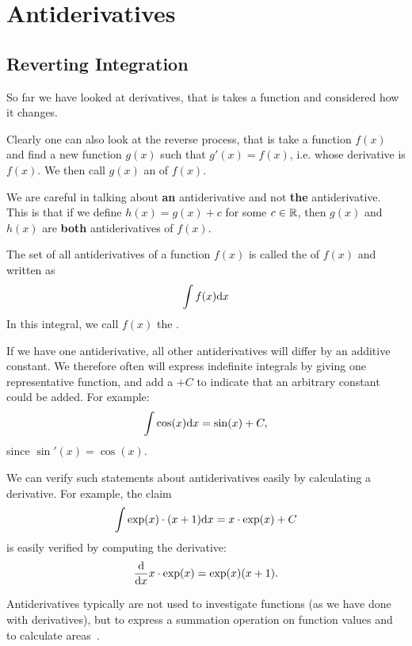 \chapter{Antiderivatives}
\label{chanti}
\section{Reverting Integration}

So far we have looked at derivatives, that is takes a function and
considered how it changes.

Clearly one can also look at the reverse process, that is take a function
$f(x)$ and find a new function $g(x)$ such that $g'(x)=f(x)$, i.e. whose
derivative is $f(x)$. We then call $g(x)$ an  of
$f(x)$.

\begin{note}
We are careful in talking about \textbf{an} antiderivative and not
\textbf{the} antiderivative. This is that if we define $h(x)=g(x)+c$ for
some $c\in{\mathbb R}$, then $g(x)$ and $h(x)$ are \textbf{both} antiderivatives of
$f(x)$.
\end{note}

\begin{defn}
The set of all antiderivatives of a function $f(x)$ is called the
 of $f(x)$ and written as
\[
\int f(x){\mbox{d}}x
\]
In this integral, we call $f(x)$ the .
\end{defn}

If we have one antiderivative, all other antiderivatives will differ by an
additive constant. We therefore often will express indefinite
integrals by giving one representative function, and add a $+C$ to indicate
that an arbitrary constant could be added. For example:
\[
\int \cos(x){\mbox{d}}x=\sin(x)+C,
\]
since $\sin'(x)=\cos(x)$.
\smallskip

We can verify such statements about antiderivatives easily by calculating a
derivative. For example, the claim
\[
\int \exp(x)\cdot (x+1){\mbox{d}}x=x\cdot\exp(x)+C
\]
is easily verified by computing the derivative:
\[
\frac{\mbox{d}}{\mbox{d}x} x\cdot\exp(x)=\exp(x)(x+1).
\]
\medskip

Antiderivatives typically are not used to investigate functions (as we have
done with derivatives), but to express a summation operation on function
values and to calculate areas~.

